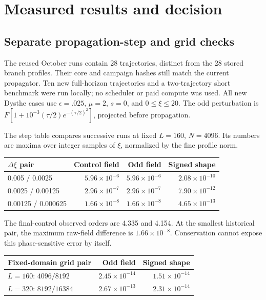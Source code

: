 \section{Measured results and decision}



\subsection{Separate propagation-step and grid checks}

The reused October runs contain 28 trajectories, distinct from the 28 stored branch profiles. Their core and campaign hashes still match the current propagator. Ten new full-horizon trajectories and a two-trajectory short benchmark were run locally; no scheduler or paid compute was used. All new Dysthe cases use $\epsilon=.025$, $\mu=2$, $s=0$, and $0\leq\xi\leq20$. The odd perturbation is $F[1+10^{-3}(\tau/2)e^{-(\tau/2)^2}]$, projected before propagation.

The step table compares successive runs at fixed $L=160$, $N=4096$. Its numbers are maxima over integer samples of $\xi$, normalized by the fine profile norm.

\begin{center}
\small
\begin{tabular}{lrrr}
\toprule
$\Delta\xi$ pair & Control field & Odd field & Signed shape \\
\midrule
0.005 / 0.0025 & $5.96\times10^{-6}$ & $5.96\times10^{-6}$ & $2.08\times10^{-10}$ \\
0.0025 / 0.00125 & $2.96\times10^{-7}$ & $2.96\times10^{-7}$ & $7.90\times10^{-12}$ \\
0.00125 / 0.000625 & $1.66\times10^{-8}$ & $1.66\times10^{-8}$ & $4.65\times10^{-13}$ \\
\bottomrule
\end{tabular}
\end{center}


The final-control observed orders are 4.335 and 4.154. At the smallest historical pair, the maximum raw-field difference is $1.66\times10^{-8}$. Conservation cannot expose this phase-sensitive error by itself.

\begin{center}
\small
\begin{tabular}{lrr}
\toprule
Fixed-domain grid pair & Odd field & Signed shape \\
\midrule
$L=160$: $4096/8192$ & $2.45\times10^{-14}$ & $1.51\times10^{-14}$ \\
$L=320$: $8192/16384$ & $2.67\times10^{-13}$ & $2.31\times10^{-14}$ \\
\bottomrule
\end{tabular}
\end{center}


